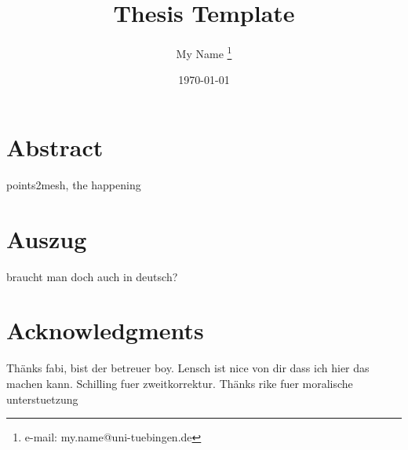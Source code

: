 \documentclass[a4paper,cleardoubleempty,BCOR1cm]{scrbook}
\title{Thesis Template}
\author{My Name \thanks{e-mail: my.name@uni-tuebingen.de}}
\date{\today}
\begin{document}


\chapter*{Abstract}
points2mesh, the happening

\chapter*{Auszug}
braucht man doch auch in deutsch?

\chapter*{Acknowledgments}
Th\"anks fabi, bist der betreuer boy. Lensch ist nice von dir dass ich hier das machen kann.
Schilling fuer zweitkorrektur.
Th\"anks rike fuer moralische unterstuetzung


\tableofcontents


















\appendix


%

\end{document}
